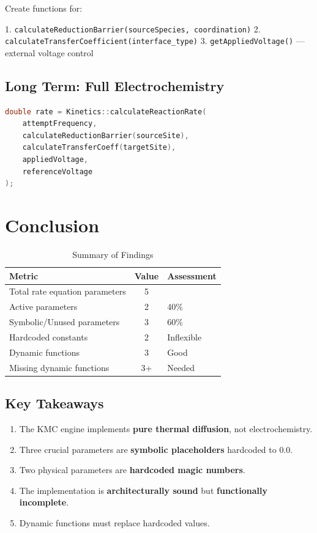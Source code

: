 \documentclass[11pt,a4paper]{article}
\begin{document}
Create functions for:

1. \texttt{calculateReductionBarrier(sourceSpecies, coordination)}
2. \texttt{calculateTransferCoefficient(interface\_type)}
3. \texttt{getAppliedVoltage()} — external voltage control

\subsection{Long Term: Full Electrochemistry}

\begin{lstlisting}[language=C++, breaklines=true]
double rate = Kinetics::calculateReactionRate(
    attemptFrequency,
    calculateReductionBarrier(sourceSite),
    calculateTransferCoeff(targetSite),
    appliedVoltage,
    referenceVoltage
);
\end{lstlisting}

\newpage

\section{Conclusion}

\begin{table}[H]
\centering
\caption{Summary of Findings}
\begin{tabular}{|l|c|l|}
\hline
\textbf{Metric} & \textbf{Value} & \textbf{Assessment} \\
\hline
Total rate equation parameters & 5 & \\
Active parameters & 2 & 40\% \\
Symbolic/Unused parameters & 3 & 60\% \\
Hardcoded constants & 2 & Inflexible \\
Dynamic functions & 3 & Good \\
Missing dynamic functions & 3+ & Needed \\
\hline
\end{tabular}
\end{table}

\subsection{Key Takeaways}

\begin{enumerate}
    \item The KMC engine implements \textbf{pure thermal diffusion}, not electrochemistry.
    
    \item Three crucial parameters are \textbf{symbolic placeholders} hardcoded to $0.0$.
    
    \item Two physical parameters are \textbf{hardcoded magic numbers}.
    
    \item The implementation is \textbf{architecturally sound} but \textbf{functionally incomplete}.
    
    \item Dynamic functions must replace hardcoded values.
\end{enumerate}
\end{document}

